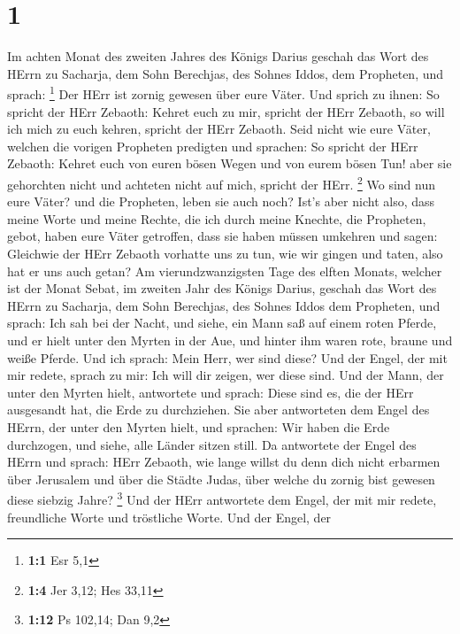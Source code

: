 \hypertarget{section}{%
\section{1}\label{section}}

 Im achten Monat des zweiten Jahres des Königs Darius
geschah das Wort des HErrn zu Sacharja, dem Sohn Berechjas, des Sohnes
Iddos, dem Propheten, und sprach: \footnote{\textbf{1:1} Esr 5,1}
 Der HErr ist zornig gewesen über eure Väter. 
Und sprich zu ihnen: So spricht der HErr Zebaoth: Kehret euch zu mir,
spricht der HErr Zebaoth, so will ich mich zu euch kehren, spricht der
HErr Zebaoth.  Seid nicht wie eure Väter, welchen die
vorigen Propheten predigten und sprachen: So spricht der HErr Zebaoth:
Kehret euch von euren bösen Wegen und von eurem bösen Tun! aber sie
gehorchten nicht und achteten nicht auf mich, spricht der HErr.
\footnote{\textbf{1:4} Jer 3,12; Hes 33,11}  Wo sind nun
eure Väter? und die Propheten, leben sie auch noch?  Ist's
aber nicht also, dass meine Worte und meine Rechte, die ich durch meine
Knechte, die Propheten, gebot, haben eure Väter getroffen, dass sie
haben müssen umkehren und sagen: Gleichwie der HErr Zebaoth vorhatte uns
zu tun, wie wir gingen und taten, also hat er uns auch getan?
 Am vierundzwanzigsten Tage des elften Monats, welcher ist
der Monat Sebat, im zweiten Jahr des Königs Darius, geschah das Wort des
HErrn zu Sacharja, dem Sohn Berechjas, des Sohnes Iddos dem Propheten,
und sprach:  Ich sah bei der Nacht, und siehe, ein Mann saß
auf einem roten Pferde, und er hielt unter den Myrten in der Aue, und
hinter ihm waren rote, braune und weiße Pferde.  Und ich
sprach: Mein Herr, wer sind diese? Und der Engel, der mit mir redete,
sprach zu mir: Ich will dir zeigen, wer diese sind.  Und
der Mann, der unter den Myrten hielt, antwortete und sprach: Diese sind
es, die der HErr ausgesandt hat, die Erde zu durchziehen. 
Sie aber antworteten dem Engel des HErrn, der unter den Myrten hielt,
und sprachen: Wir haben die Erde durchzogen, und siehe, alle Länder
sitzen still.  Da antwortete der Engel des HErrn und
sprach: HErr Zebaoth, wie lange willst du denn dich nicht erbarmen über
Jerusalem und über die Städte Judas, über welche du zornig bist gewesen
diese siebzig Jahre? \footnote{\textbf{1:12} Ps 102,14; Dan 9,2}
 Und der HErr antwortete dem Engel, der mit mir redete,
freundliche Worte und tröstliche Worte.  Und der Engel, der
